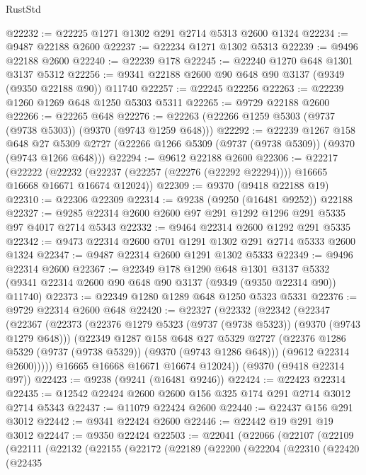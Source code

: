 \begin{lexlean}{RustStd}
\begin{coremodule}
@22232 := @22225 @1271 @1302 @291 @2714 @5313 @2600 @1324
@22234 := @9487 @22188 @2600
@22237 := @22234 @1271 @1302 @5313
@22239 := @9496 @22188 @2600
@22240 := @22239 @178
@22245 := @22240 @1270 @648 @1301 @3137 @5312
@22256 := @9341 @22188 @2600 @90 @648 @90 @3137 (@9349 (@9350 @22188 @90)) @11740
@22257 := @22245 @22256
@22263 := @22239 @1260 @1269 @648 @1250 @5303 @5311
@22265 := @9729 @22188 @2600
@22266 := @22265 @648
@22276 := @22263 (@22266 @1259 @5303 (@9737 (@9738 @5303)) (@9370 (@9743 @1259 @648)))
@22292 := @22239
    @1267
    @158
    @648
    @27
    @5309
    @2727
    (@22266 @1266 @5309 (@9737 (@9738 @5309)) (@9370 (@9743 @1266 @648)))
@22294 := @9612 @22188 @2600
@22306 := @22217
    (@22222 (@22232 (@22237 (@22257 (@22276 (@22292 @22294)))) @16665 @16668 @16671 @16674 @12024))
@22309 := @9370 (@9418 @22188 @19)
@22310 := @22306 @22309
@22314 := @9238 (@9250 (@16481 @9252)) @22188
@22327 := @9285 @22314 @2600 @2600 @97 @291 @1292 @1296 @291 @5335 @97 @4017 @2714 @5343
@22332 := @9464 @22314 @2600 @1292 @291 @5335
@22342 := @9473 @22314 @2600 @701 @1291 @1302 @291 @2714 @5333 @2600 @1324
@22347 := @9487 @22314 @2600 @1291 @1302 @5333
@22349 := @9496 @22314 @2600
@22367 := @22349
    @178
    @1290
    @648
    @1301
    @3137
    @5332
    (@9341 @22314 @2600 @90 @648 @90 @3137 (@9349 (@9350 @22314 @90)) @11740)
@22373 := @22349 @1280 @1289 @648 @1250 @5323 @5331
@22376 := @9729 @22314 @2600 @648
@22420 := @22327
    (@22332
      (@22342
        (@22347
          (@22367
            (@22373
              (@22376 @1279 @5323 (@9737 (@9738 @5323)) (@9370 (@9743 @1279 @648)))
              (@22349
                @1287
                @158
                @648
                @27
                @5329
                @2727
                (@22376 @1286 @5329 (@9737 (@9738 @5329)) (@9370 (@9743 @1286 @648)))
                (@9612 @22314 @2600)))))
        @16665
        @16668
        @16671
        @16674
        @12024))
    (@9370 (@9418 @22314 @97))
@22423 := @9238 (@9241 (@16481 @9246))
@22424 := @22423 @22314
@22435 := @12542 @22424 @2600 @2600 @156 @325 @174 @291 @2714 @3012 @2714 @5343
@22437 := @11079 @22424 @2600
@22440 := @22437 @156 @291 @3012
@22442 := @9341 @22424 @2600
@22446 := @22442 @19 @291 @19 @3012
@22447 := @9350 @22424
@22503 := @22041
    (@22066
      (@22107
        (@22109
          (@22111
            (@22132
              (@22155
                (@22172
                  (@22189
                    (@22200
                      (@22204
                        (@22310
                          (@22420
                            (@22435

\end{coremodule}
\end{lexlean}

